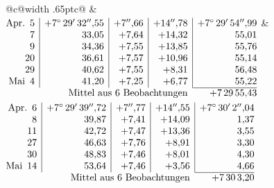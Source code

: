 \noindent\begin{tabular}{@{}c@{\hspace{.4em}\vrule width .65pt\hspace{.4em}}c@{}}
 &
 \\[.18ex]
\(\begin{array}[t]{@{}r|r|r|r|r@{}}
\text{Apr.}\enspace 5 & +7^\circ\,29'\,32''{,}55 & +7''{,}66 & +14''{,}78 & +7^\circ\,29'\,54''{,}99\\
7 & 33{,}05 & +7{,}64 & +14{,}32 & 55{,}01\\
9 & 34{,}36 & +7{,}55 & +13{,}85 & 55{,}76\\
20 & 36{,}61 & +7{,}57 & +10{,}96 & 55{,}14\\
29 & 40{,}62 & +7{,}55 & +8{,}31 & 56{,}48\\
\text{Mai}\enspace 4 & 41{,}20 & +7{,}25 & +6{,}77 & 55{,}22\\
\cline{5-5}
\multicolumn{4}{r}{\text{Mittel aus 6 Beobachtungen}} & +7\,29\,55{,}43
\end{array}\)
&
\(\begin{array}[t]{@{}r|r|r|r|r@{}}
\text{Apr.}\enspace 6 & +7^\circ\,29'\,39''{,}72 & +7''{,}77 & +14''{,}55 & +7^\circ\,30'\,2''{,}04\\
8 & 39{,}87 & +7{,}41 & +14{,}09 & 1{,}37\\
11 & 42{,}72 & +7{,}47 & +13{,}36 & 3{,}55\\
27 & 46{,}63 & +7{,}76 & +8{,}91 & 3{,}30\\
30 & 48{,}83 & +7{,}46 & +8{,}01 & 4{,}30\\
\text{Mai}\enspace 14 & 53{,}64 & +7{,}46 & +3{,}56 & 4{,}66\\
\cline{5-5}
\multicolumn{4}{r}{\text{Mittel aus 6 Beobachtungen}} & +7\,30\,3{,}20
\end{array}\)
\end{tabular}\par\medskip
